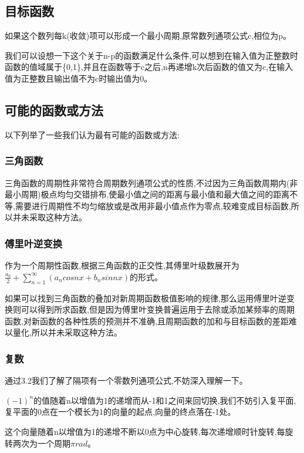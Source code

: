 \documentclass[final,3p,times,onecolumn]{elsarticle}
\begin{document}
\subsection{目标函数}

如果这个数列每k(收敛)项可以形成一个最小周期,原常数列通项公式c,相位为p。

我们可以设想一下这个关于n-p的函数满足什么条件,可以想到在输入值为正整数时函数的值域属于\{0,1\},并且在函数等于c之后,n再递增k次后函数的值又为c,在输入值为正整数且输出值不为c时输出值为0。

\subsection{可能的函数或方法}

以下列举了一些我们认为最有可能的函数或方法:

\subsubsection{三角函数}

三角函数的周期性非常符合周期数列通项公式的性质,不过因为三角函数周期内(非最小周期)极点均匀交错排布,使最小值之间的距离与最小值和最大值之间的距离不等,需要进行周期性不均匀缩放或是改用非最小值点作为零点,较难变成目标函数,所以并未采取这种方法。

\subsubsection{傅里叶逆变换}

作为一个周期性函数,根据三角函数的正交性,其傅里叶级数展开为$\frac{a_0}{2}+\sum\limits_{n=1}^\infty (a_ncosnx+b_nsinnx)$的形式。

如果可以找到三角函数的叠加对新周期函数极值影响的规律,那么运用傅里叶逆变换则可以得到所求函数,但是因为傅里叶变换普遍运用于去除或添加某频率的周期函数,对新函数的各种性质的预测并不准确,且周期函数的加和与目标函数的差距难以量化,所以并未采取这种方法。

\subsubsection{复数}

通过3.2我们了解了隔项有一个零数列通项公式,不妨深入理解一下。

$(-1)^n$的值随着n以增值为1的递增而从-1和1之间来回切换,我们不妨引入复平面,复平面的0点在一个模长为1的向量的起点,向量的终点落在-1处。

这个向量随着n以增值为1的递增不断以0点为中心旋转,每次递增顺时针旋转,每旋转两次为一个周期$\pi rad$。
\end{document}
